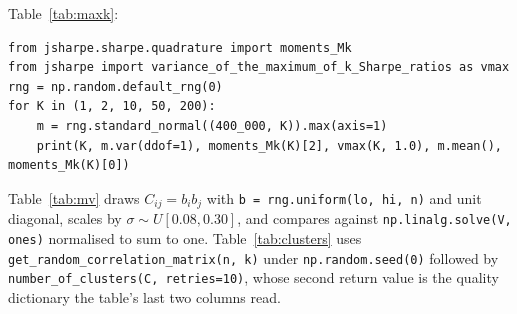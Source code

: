 \documentclass[11pt,a4paper]{article}
\newcommand{\code}[1]{\texttt{#1}}
\begin{document}
Table~\ref{tab:maxk}:

\begin{verbatim}
from jsharpe.sharpe.quadrature import moments_Mk
from jsharpe import variance_of_the_maximum_of_k_Sharpe_ratios as vmax
rng = np.random.default_rng(0)
for K in (1, 2, 10, 50, 200):
    m = rng.standard_normal((400_000, K)).max(axis=1)
    print(K, m.var(ddof=1), moments_Mk(K)[2], vmax(K, 1.0), m.mean(), moments_Mk(K)[0])
\end{verbatim}

Table~\ref{tab:mv} draws $C_{ij} = b_i b_j$ with
\code{b = rng.uniform(lo, hi, n)} and unit diagonal, scales by
$\sigma \sim U[0.08, 0.30]$, and compares against
\code{np.linalg.solve(V, ones)} normalised to sum to one.
Table~\ref{tab:clusters} uses
\code{get\_random\_correlation\_matrix(n, k)} under
\code{np.random.seed(0)} followed by
\code{number\_of\_clusters(C, retries=10)}, whose second return value is the
quality dictionary the table's last two columns read.



\end{document}
